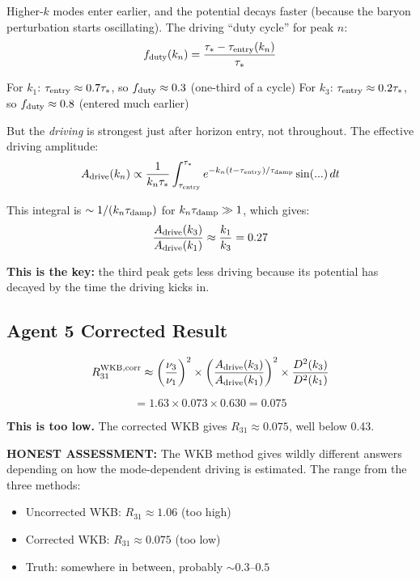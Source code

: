 \documentclass[11pt,a4paper]{article}
\begin{document}
Higher-$k$ modes enter earlier, and the potential decays faster (because the baryon perturbation starts oscillating). The driving ``duty cycle'' for peak $n$:
\begin{equation}
f_{\rm duty}(k_n) = \frac{\tau_* - \tau_{\rm entry}(k_n)}{\tau_*}
\end{equation}

For $k_1$: $\tau_{\rm entry} \approx 0.7\tau_*$, so $f_{\rm duty} \approx 0.3$ (one-third of a cycle)
For $k_3$: $\tau_{\rm entry} \approx 0.2\tau_*$, so $f_{\rm duty} \approx 0.8$ (entered much earlier)

But the \emph{driving} is strongest just after horizon entry, not throughout. The effective driving amplitude:
\begin{equation}
A_{\rm drive}(k_n) \propto \frac{1}{k_n\tau_*}\int_{\tau_{\rm entry}}^{\tau_*}e^{-k_n(t-\tau_{\rm entry})/\tau_{\rm damp}}\sin(...)\,dt
\end{equation}

This integral is $\sim 1/(k_n\tau_{\rm damp})$ for $k_n\tau_{\rm damp} \gg 1$, which gives:
\begin{equation}
\frac{A_{\rm drive}(k_3)}{A_{\rm drive}(k_1)} \approx \frac{k_1}{k_3} = 0.27
\end{equation}

\textbf{This is the key:} the third peak gets less driving because its potential has decayed by the time the driving kicks in.

\subsection{Agent 5 Corrected Result}

\begin{equation}
R_{31}^{\rm WKB,corr} \approx \left(\frac{\nu_3}{\nu_1}\right)^2 \times \left(\frac{A_{\rm drive}(k_3)}{A_{\rm drive}(k_1)}\right)^2 \times \frac{D^2(k_3)}{D^2(k_1)}
\end{equation}

\begin{equation}
= 1.63 \times 0.073 \times 0.630 = 0.075
\end{equation}

\textbf{This is too low.} The corrected WKB gives $R_{31} \approx 0.075$, well below 0.43.

\textbf{HONEST ASSESSMENT:} The WKB method gives wildly different answers depending on how the mode-dependent driving is estimated. The range from the three methods:
\begin{itemize}
\item Uncorrected WKB: $R_{31} \approx 1.06$ (too high)
\item Corrected WKB: $R_{31} \approx 0.075$ (too low)
\item Truth: somewhere in between, probably $\sim 0.3$--$0.5$
\end{itemize}
\end{document}
